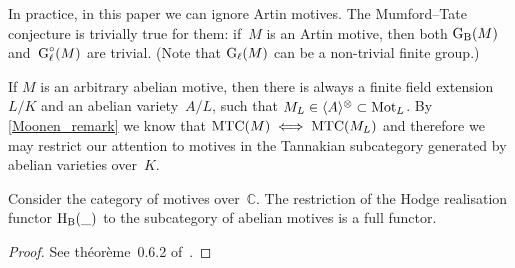 \documentclass[10pt,twoside,leqno]{article}
\numberwithin{equation}{subsection}
\newcommand{\onto}{\twoheadrightarrow}
\newcommand{\End}{\textnormal{End}}
\newcommand{\QQ}{\mathbb{Q}}
\newcommand{\QQl}{\QQ_{\ell}}
\newcommand{\CC}{\mathbb{C}}
\newcommand{\Vect}{\textnormal{Vect}}
\newcommand{\HH}{\textnormal{H}}
\newcommand{\Hl}{\HH_{\ell}}
\newcommand{\HB}{\HH_{\textnormal{B}}}
\newcommand{\Mot}{\textnormal{Mot}}
\newcommand{\Zentrum}{\textnormal{Z}}
\newcommand{\GG}{\textnormal{G}}
\newcommand{\GB}{\GG_{\textnormal{B}}}
\newcommand{\Gl}{\GG_{\ell}}
\newcommand{\Glc}{\Gl^{\circ}}
\newcommand{\Tangen}[1]{\langle #1 \rangle^{\otimes}}
\newcommand{\MTC}{\textnormal{MTC}}
\begin{document}
\begin{remark} %
 \label{ignore-Artin-motives}
 In practice, in this paper we can ignore Artin motives.
 The Mumford--Tate conjecture is trivially true for them:
 if~$M$ is an Artin motive, then both $\GB(M)$ and~$\Glc(M)$ are trivial.
 (Note that $\Gl(M)$ can be a non-trivial finite group.)

 If $M$ is an arbitrary abelian motive,
 then there is always a finite field extension~$L/K$
 and an abelian variety~$A/L$, such that $M_L \in \Tangen{A} \subset \Mot_L$.
 By \cref{Moonen_remark} we know that $\MTC(M) \iff \MTC(M_L)$
 and therefore we may restrict our attention to
 motives in the Tannakian subcategory generated by abelian varieties over~$K$.
\end{remark}

\begin{theorem} %
 \label{hodge-is-motivated}
	Consider the category of motives over~$\CC$.
 The restriction of the Hodge realisation functor $\HB(\_)$
 to the subcategory of abelian motives is a full functor.
 \begin{proof}
  See th\'eor\`eme~0.6.2 of~\cite{An95}.
 \end{proof}
\end{theorem}

\begin{remark} %
\end{remark}
\end{document}
